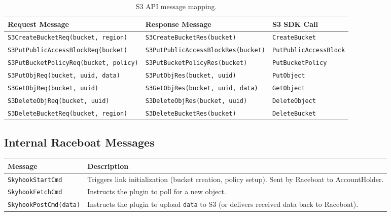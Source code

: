 \documentclass[11pt]{article}
\begin{document}
\begin{table}[H]
\centering
\small
\begin{tabular}{@{}lll@{}}
\toprule
\textbf{Request Message} & \textbf{Response Message} & \textbf{S3 SDK Call} \\
\midrule
\texttt{S3CreateBucketReq(bucket, region)}       & \texttt{S3CreateBucketRes(bucket)}             & \texttt{CreateBucket} \\
\texttt{S3PutPublicAccessBlockReq(bucket)}       & \texttt{S3PutPublicAccessBlockRes(bucket)}     & \texttt{PutPublicAccessBlock} \\
\texttt{S3PutBucketPolicyReq(bucket, policy)}    & \texttt{S3PutBucketPolicyRes(bucket)}          & \texttt{PutBucketPolicy} \\
\texttt{S3PutObjReq(bucket, uuid, data)}         & \texttt{S3PutObjRes(bucket, uuid)}             & \texttt{PutObject} \\
\texttt{S3GetObjReq(bucket, uuid)}               & \texttt{S3GetObjRes(bucket, uuid, data)}       & \texttt{GetObject} \\
\texttt{S3DeleteObjReq(bucket, uuid)}            & \texttt{S3DeleteObjRes(bucket, uuid)}           & \texttt{DeleteObject} \\
\texttt{S3DeleteBucketReq(bucket, region)}       & \texttt{S3DeleteBucketRes(bucket)}             & \texttt{DeleteBucket} \\
\bottomrule
\end{tabular}
\caption{S3 API message mapping.}
\label{tab:s3messages}
\end{table}

\subsection{Internal Raceboat Messages}

\begin{table}[H]
\centering
\begin{tabular}{@{}lp{8cm}@{}}
\toprule
\textbf{Message} & \textbf{Description} \\
\midrule
\texttt{SkyhookStartCmd}   & Triggers link initialization (bucket creation, policy setup). Sent by Raceboat to AccountHolder. \\
\texttt{SkyhookFetchCmd}   & Instructs the plugin to poll for a new object. \\
\texttt{SkyhookPostCmd(data)} & Instructs the plugin to upload \texttt{data} to S3 (or delivers received data back to Raceboat). \\
\bottomrule
\end{tabular}
\end{table}
\end{document}
